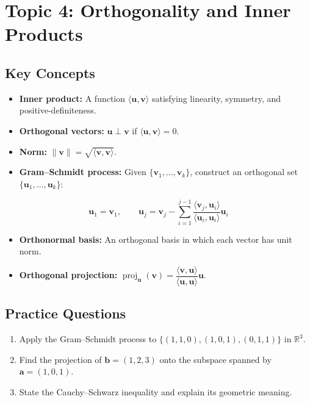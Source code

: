 \documentclass[
    language=english,
    doctype=study-guide,
    institution=none,
]{../../omnilatex}
\begin{document}
\section{Topic 4: Orthogonality and Inner Products}

\subsection{Key Concepts}

\begin{itemize}
    \item \textbf{Inner product:} A function $\langle \mathbf{u}, \mathbf{v} \rangle$ satisfying linearity, symmetry, and positive-definiteness.
    \item \textbf{Orthogonal vectors:} $\mathbf{u} \perp \mathbf{v}$ if $\langle \mathbf{u}, \mathbf{v} \rangle = 0$.
    \item \textbf{Norm:} $\|\mathbf{v}\| = \sqrt{\langle \mathbf{v}, \mathbf{v} \rangle}$.
    \item \textbf{Gram--Schmidt process:} Given $\{\mathbf{v}_1, \ldots, \mathbf{v}_k\}$, construct an orthogonal set $\{\mathbf{u}_1, \ldots, \mathbf{u}_k\}$:
\end{itemize}

\[
    \mathbf{u}_1 = \mathbf{v}_1, \qquad \mathbf{u}_j = \mathbf{v}_j - \sum_{i=1}^{j-1} \frac{\langle \mathbf{v}_j, \mathbf{u}_i \rangle}{\langle \mathbf{u}_i, \mathbf{u}_i \rangle} \mathbf{u}_i
\]

\begin{itemize}
    \item \textbf{Orthonormal basis:} An orthogonal basis in which each vector has unit norm.
    \item \textbf{Orthogonal projection:} $\operatorname{proj}_{\mathbf{u}}(\mathbf{v}) = \dfrac{\langle \mathbf{v}, \mathbf{u} \rangle}{\langle \mathbf{u}, \mathbf{u} \rangle} \mathbf{u}$.
\end{itemize}

\subsection{Practice Questions}

\begin{enumerate}
    \item Apply the Gram--Schmidt process to $\{(1,1,0), (1,0,1), (0,1,1)\}$ in $\mathbb{R}^3$.
    \item Find the projection of $\mathbf{b} = (1,2,3)$ onto the subspace spanned by $\mathbf{a} = (1,0,1)$.
    \item State the Cauchy--Schwarz inequality and explain its geometric meaning.
\end{enumerate}
\end{document}
